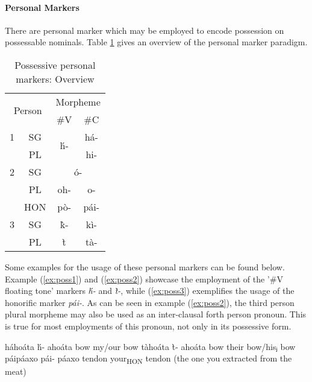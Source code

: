 \documentclass[a4paper, 12pt, oneside]{memoir}
\newcommand{\emh}[1]{\textit{#1}}
\begin{document}
\paragraph{Personal Markers}\label{spossmarker}
There are personal marker which may be employed to encode possession on possessable nominals. Table \ref{tpossmarker} gives an overview of the personal marker paradigm.
\begin{table}[H]
\centering
\begin{tabular}{@{}cccc@{}}
\toprule
\multicolumn{2}{c}{\multirow{2}{*}{Person}} & \multicolumn{2}{c}{Morpheme} \\ \cmidrule(l){3-4} 
\multicolumn{2}{c}{} & \#V & \#C \\ \midrule
1 & SG & \multirow{2}{*}{h́-} & há- \\ \cmidrule(lr){2-2}
 & PL &  & hi- \\ \cmidrule(lr){2-2}
2 & SG & \multicolumn{2}{c}{ó-} \\ \cmidrule(lr){2-2}
 & PL & oh- & o- \\ \cmidrule(lr){2-2}
 & HON & pò- & pái- \\ \cmidrule(lr){2-2}
3 & SG & k̀- & kì- \\ \cmidrule(lr){2-2}
 & PL & t̀& tà- \\ \bottomrule
\end{tabular}
\caption{Possessive personal markers: Overview}
\label{tpossmarker}
\end{table}
Some examples for the usage of these personal markers can be found below. Example (\ref{ex:poss1}) and (\ref{ex:poss2}) showcase the employment of the '\#V floating tone' markers \emh{h́-} and \emh{t̀-}, while (\ref{ex:poss3}) exemplifies the usage of the honorific marker \emh{pái-}. As can be seen in example (\ref{ex:poss2}), the third person plural morpheme may also be used as an inter-clausal forth person pronoun. This is true for most employments of this pronoun, not only in its possessive form.
\begin{examples}
\ex
\label{ex:poss1}
\words háhoáta
\bits h́- ahoáta
\gloss {\Fsposs} bow
\tr my/our bow
\ex
\label{ex:poss2}
\words tàhoáta
\bits t̀- ahoáta
\gloss {\Tpposs} bow
\tr their bow/hisⱼ bow
\ex 
\label{ex:poss3}
\words páipáaxo
\bits pái- páaxo
\gloss {\Sshposs} tendon
\tr your\textsubscript{HON} tendon (the one you extracted from the meat)
\end{examples}
\end{document}

